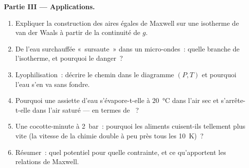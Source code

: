 \begin{problem}
\textbf{Partie III --- Applications.}
\begin{enumerate}[resume]
  \item Expliquer la construction des aires égales de Maxwell sur une isotherme
        de van der Waals à partir de la continuité de $g$.
  \item De l'eau surchauffée «~sursaute~» dans un micro-ondes~: quelle branche de
        l'isotherme, et pourquoi le danger~?
  \item Lyophilisation~: décrire le chemin dans le diagramme $(P,T)$ et
        pourquoi l'eau s'en va sans fondre.
  \item Pourquoi une assiette d'eau s'évapore-t-elle à \qty{20}{\celsius} dans l'air sec
        et s'arrête-t-elle dans l'air saturé --- en termes de ~?
  \item Une cocotte-minute à \qty{2}{bar}~: pourquoi les aliments cuisent-ils tellement
        plus vite (la vitesse de la chimie double à peu près tous les
        \qty{10}{K})~?
  \item Résumer~: quel potentiel pour quelle contrainte, et ce qu'apportent les
        relations de Maxwell.
\end{enumerate}
\end{problem}
